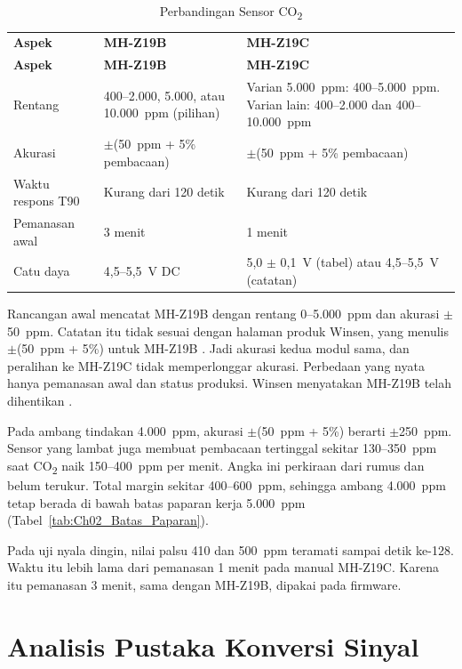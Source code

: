    \begin{longtable}{|L{3.0cm}|L{6.0cm}|L{6.0cm}|}
        \caption{Perbandingan Sensor CO\textsubscript{2}}
        \label{tab:Ch03_Sensor_CO2}
        \vspace{-0.75em}\\
        \hline
        \textbf{Aspek} & \textbf{MH-Z19B \cite{mhz19b}} & \textbf{MH-Z19C \cite{mhz19c}} \\ \hline
        \endfirsthead
        \hline
        \textbf{Aspek} & \textbf{MH-Z19B \cite{mhz19b}} & \textbf{MH-Z19C \cite{mhz19c}} \\ \hline
        \endhead
        Rentang & 400--2.000, 5.000, atau 10.000~ppm (pilihan) & Varian 5.000~ppm: 400--5.000~ppm. Varian lain: 400--2.000 dan 400--10.000~ppm \\ \hline
        Akurasi & $\pm$(50~ppm + 5\% pembacaan) & $\pm$(50~ppm + 5\% pembacaan) \\ \hline
        Waktu respons T90 & Kurang dari 120 detik & Kurang dari 120 detik \\ \hline
        Pemanasan awal & 3 menit & 1 menit \\ \hline
        Catu daya & 4,5--5,5~V DC & 5,0 $\pm$ 0,1~V (tabel) atau 4,5--5,5~V (catatan) \\ \hline
    \end{longtable}

    Rancangan awal mencatat MH-Z19B dengan rentang 0--5.000~ppm dan akurasi $\pm$50~ppm. Catatan itu tidak sesuai dengan halaman produk Winsen, yang menulis $\pm$(50~ppm + 5\%) untuk MH-Z19B \cite{mhz19b}. Jadi akurasi kedua modul sama, dan peralihan ke MH-Z19C tidak memperlonggar akurasi. Perbedaan yang nyata hanya pemanasan awal dan status produksi. Winsen menyatakan MH-Z19B telah dihentikan \cite{mhz19b}.

    Pada ambang tindakan 4.000~ppm, akurasi $\pm$(50~ppm + 5\%) berarti $\pm$250~ppm. Sensor yang lambat juga membuat pembacaan tertinggal sekitar 130--350~ppm saat CO\textsubscript{2} naik 150--400~ppm per menit. Angka ini perkiraan dari rumus dan belum terukur. Total margin sekitar 400--600~ppm, sehingga ambang 4.000~ppm tetap berada di bawah batas paparan kerja 5.000~ppm (Tabel~\ref{tab:Ch02_Batas_Paparan}).

    Pada uji nyala dingin, nilai palsu 410 dan 500~ppm teramati sampai detik ke-128. Waktu itu lebih lama dari pemanasan 1 menit pada manual MH-Z19C. Karena itu pemanasan 3 menit, sama dengan MH-Z19B, dipakai pada firmware.

\section{Analisis Pustaka Konversi Sinyal}
\label{sec:Analisis_Konversi_Sinyal}

